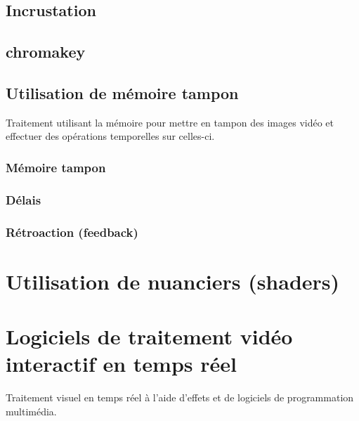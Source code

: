 \documentclass[
  french,
]{book}
\begin{document}
\hypertarget{incrustation}{%
\subsection{Incrustation}\label{incrustation}}

\hypertarget{chromakey}{%
\subsection{chromakey}\label{chromakey}}

\hypertarget{utilisation-de-muxe9moire-tampon}{%
\subsection{Utilisation de mémoire tampon}\label{utilisation-de-muxe9moire-tampon}}

Traitement utilisant la mémoire pour mettre en tampon des images vidéo et effectuer des opérations temporelles sur celles-ci.

\hypertarget{muxe9moire-tampon}{%
\subsubsection{Mémoire tampon}\label{muxe9moire-tampon}}

\hypertarget{duxe9lais}{%
\subsubsection{Délais}\label{duxe9lais}}

\hypertarget{ruxe9troaction-feedback}{%
\subsubsection{Rétroaction (feedback)}\label{ruxe9troaction-feedback}}

\hypertarget{utilisation-de-nuanciers-shaders}{%
\section{Utilisation de nuanciers (shaders)}\label{utilisation-de-nuanciers-shaders}}

\hypertarget{traiter_logiciels}{%
\section{Logiciels de traitement vidéo interactif en temps réel}\label{traiter_logiciels}}

Traitement visuel en temps réel à l'aide d'effets et de logiciels de programmation multimédia.
\end{document}
